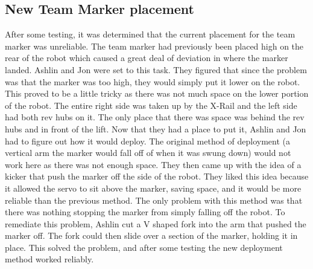 \documentclass{article}
\begin{document}
\subsection{New Team Marker placement}
After some testing, it was determined that the current placement for the team marker was unreliable. The team marker had previously been placed high on the rear of the robot which caused a great deal of deviation in where the marker landed. Ashlin and Jon were set to this task. They figured that since the problem was that the marker was too high, they would simply put it lower on the robot. This proved to be a little tricky as there was not much space on the lower portion of the robot. The entire right side was taken up by the X-Rail and the left side had both rev hubs on it. The only place that there was space was behind the rev hubs and in front of the lift. Now that they had a place to put it, Ashlin and Jon had to figure out how it would deploy. The original method of deployment (a vertical arm the marker would fall off of when it was swung down) would not work here as there was not enough space. They then came up with the idea of a kicker that push the marker off the side of the robot. They liked this idea because it allowed the servo to sit above the marker, saving space, and it would be more reliable than the previous method. The only problem with this method was that there was nothing stopping the marker from simply falling off the robot. To remediate this problem, Ashlin cut a V shaped fork into the arm that pushed the marker off. The fork could then slide over a section of the marker, holding it in place. This solved the problem, and after some testing the new deployment method worked reliably. 
\end{document}
